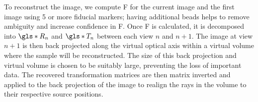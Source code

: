 \documentclass{osa-article}
\begin{document}
To reconstruct the image, we compute \gls*{F} for the current image and the first image using 5 or more fiducial markers; having additional beads helps to remove ambiguity and increase confidence in \gls*{F}.
Once \gls*{F} is calculated, it is decomposed into \(\gls*{R}_n\) and \(\gls*{T}_n\) between each view \(n\) and \(n+1\).
The image at view \(n+1\) is then back projected along the virtual optical axis within a virtual volume where the sample will be reconstructed.
The size of this back projection and virtual volume is chosen to be suitably large, preventing the loss of important data.
The recovered transformation matrices are then matrix inverted and applied to the back projection of the image to realign the rays in the volume to their respective source positions. %
\end{document}
